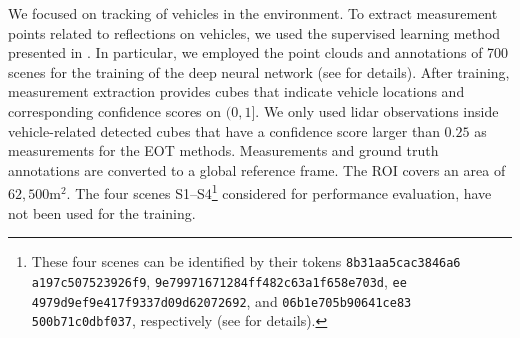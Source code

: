 \documentclass[10pt, twoside, romanappendices]{IEEEtran}
\begin{document}
We focused on tracking of vehicles in the environment. To extract measurement points related to reflections on vehicles, we used the supervised learning method presented in \cite{ZhuJiaZhoLiYu:19}. In particular, we employed the point clouds and annotations of 700 scenes for the training of the deep neural network (see \cite{ZhuJiaZhoLiYu:19} for details). After training, measurement extraction provides cubes that indicate vehicle locations and corresponding confidence scores on $(0,1]$. We only used lidar observations inside vehicle-related detected cubes that have a confidence score larger than $0.25$ as measurements for the EOT methods. Measurements and ground truth annotations are converted to a global reference frame.  The ROI covers an area of $62,500$m$^2$. The four scenes S1--S4\footnote{ These four scenes can be identified by their tokens \texttt{8b31aa5cac3846a6}
\texttt{a197c507523926f9}, \texttt{9e79971671284ff482c63a1f658e703d}, \texttt{ee} 
\texttt{4979d9ef9e417f9337d09d62072692}, and \texttt{06b1e705b90641ce83}
\texttt{500b71c0dbf037}, respectively (see \cite{nuScenes:W21} for details). }
considered for performance evaluation, have not been used for the training.
\end{document}
